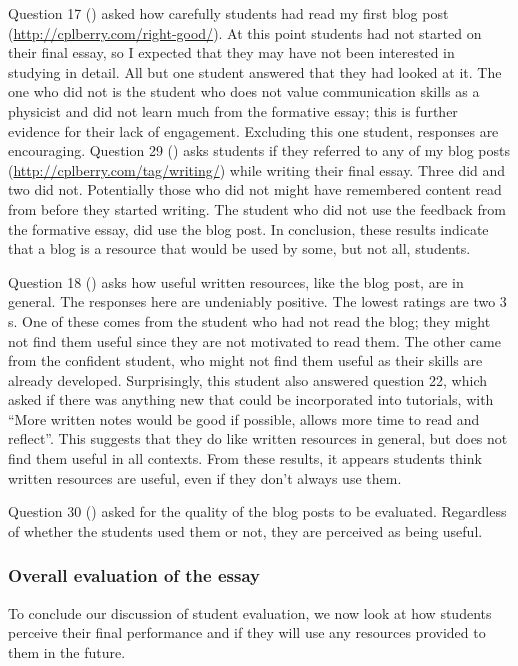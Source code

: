 Question 17 () asked how carefully students had read my first blog post (\url{http://cplberry.com/right-good/}). At this point students had not started on their final essay, so I expected that they may have not been interested in studying in detail. All but one student answered that they had looked at it. The one who did not is the student who does not value communication skills as a physicist and did not learn much from the formative essay; this is further evidence for their lack of engagement. Excluding this one student, responses are encouraging. Question 29 () asks students if they referred to any of my blog posts (\url{http://cplberry.com/tag/writing/}) while writing their final essay. Three did and two did not. Potentially those who did not might have remembered content read from before they started writing. The student who did not use the feedback from the formative essay, did use the blog post. In conclusion, these results indicate that a blog is a resource that would be used by some, but not all, students.

Question 18 () asks how useful written resources, like the blog post, are in general. The responses here are undeniably positive. The lowest ratings are two $3$s. One of these comes from the student who had not read the blog; they might not find them useful since they are not motivated to read them. The other came from the confident student, who might not find them useful as their skills are already developed. Surprisingly, this student also answered question 22, which asked if there was anything new that could be incorporated into tutorials, with ``More written notes would be good if possible, allows more time to read and reflect''. This suggests that they do like written resources in general, but does not find them useful in all contexts. From these results, it appears students think written resources are useful, even if they don't always use them.

Question 30 () asked for the quality of the blog posts to be evaluated. Regardless of whether the students used them or not, they are perceived as being useful.

\subsubsection{Overall evaluation of the essay}\label{sec:views-essay}

To conclude our discussion of student evaluation, we now look at how students perceive their final performance and if they will use any resources provided to them in the future.


